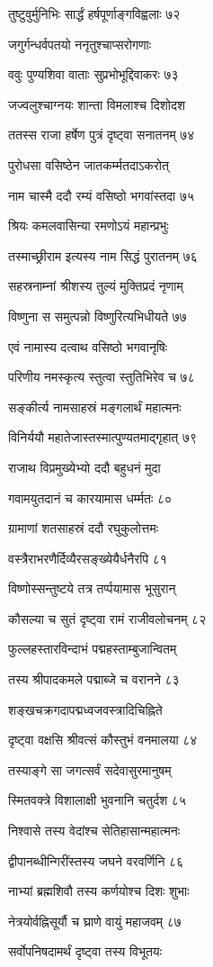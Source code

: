 तुष्टुवुर्मुनिभिः सार्द्धं हर्षपूर्णाङ्गविह्वलाः ७२

जगुर्गन्धर्वपतयो ननृतुश्चाप्सरोगणाः

ववुः पुण्यशिवा वाताः सुप्रभोभूद्दिवाकरः ७३

जज्वलुश्चाग्नयः शान्ता विमलाश्च दिशोदश

ततस्स राजा हर्षेण पुत्रं दृष्ट्वा सनातनम् ७४

पुरोधसा वसिष्ठेन जातकर्म्मतदाऽकरोत्

नाम चास्मै ददौ रम्यं वसिष्ठो भगवांस्तदा ७५

श्रियः कमलवासिन्या रमणोऽयं महान्प्रभुः

तस्माच्छ्रीराम इत्यस्य नाम सिद्धं पुरातनम् ७६

सहस्रनाम्नां श्रीशस्य तुल्यं मुक्तिप्रदं नृणाम्

विष्णुना स समुत्पन्नो विष्णुरित्यभिधीयते ७७

एवं नामास्य दत्वाथ वसिष्ठो भगवानृषिः

परिणीय नमस्कृत्य स्तुत्वा स्तुतिभिरेव च ७८

सङ्कीर्त्य नामसाहस्रं मङ्गलार्थं महात्मनः

विनिर्ययौ महातेजास्तस्मात्पुण्यतमाद्गृहात् ७९

राजाथ विप्रमुख्येभ्यो ददौ बहुधनं मुदा

गवामयुतदानं च कारयामास धर्म्मतः ८०

ग्रामाणां शतसाहस्रं ददौ रघुकुलोत्तमः

वस्त्रैराभरणैर्दिव्यैरसङ्ख्येयैर्धनैरपि ८१

विष्णोस्सन्तुष्टये तत्र तर्प्पयामास भूसुरान्

कौसल्या च सुतं दृष्ट्वा रामं राजीवलोचनम् ८२

फुल्लहस्तारविन्दाभं पद्महस्ताम्बुजान्वितम्

तस्य श्रीपादकमले पद्माब्जे च वरानने ८३

शङ्खचक्रगदापद्मध्वजवस्त्रादिचिह्निते

दृष्ट्वा वक्षसि श्रीवत्सं कौस्तुभं वनमालया ८४

तस्याङ्गे सा जगत्सर्वं सदेवासुरमानुषम्

स्मितवक्त्रे विशालाक्षी भुवनानि चतुर्दश ८५

निश्वासे तस्य वेदांश्च सेतिहासान्महात्मनः

द्वीपानब्धीन्गिरींस्तस्य जघने वरवर्णिनि ८६

नाभ्यां ब्रह्मशिवौ तस्य कर्णयोश्च दिशः शुभाः

नेत्रयोर्वह्निसूर्यौ च घ्राणे वायुं महाजवम् ८७

सर्वोपनिषदामर्थं दृष्ट्वा तस्य विभूतयः

